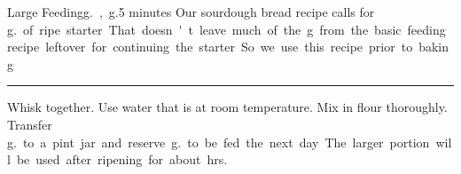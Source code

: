 \begin{recipe}{Large Feeding}{\unit[225]{g.}, \unit[100]{g.}}{5 minutes}
\freeform Our sourdough bread recipe calls for \unit[185]{g.} of ripe starter. That doesn't leave much of the \unit[225]{g} from the basic feeding recipe leftover for continuing the starter. So we use this recipe prior to baking.\\
\rule{\textwidth}{0.05pt}
\hspace*{10mm}
Whisk together. Use water that is at room temperature.
Mix in flour thoroughly.
\freeform  Transfer \unit[225]{g.} to a pint jar and reserve \unit[100]{g.} to be fed the next day. The larger portion will be used after ripening for about \unit[3]{hrs.}
\end{recipe}
